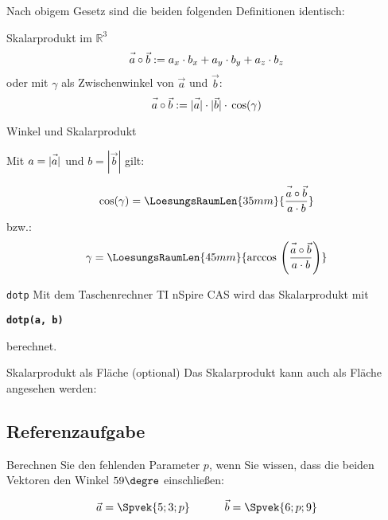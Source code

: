 Nach obigem Gesetz sind die beiden folgenden Definitionen identisch:
\begin{definition}{Skalarprodukt im $\mathbb{R}^3$}{}
  $$\vec{a\vphantom{b}}\circ\vec{b} := a_x\cdot{}b_x + a_y \cdot{} b_y + a_z\cdot{}b_z$$
oder mit $\gamma$ als Zwischenwinkel von $\vec{a}$ und $\vec{b}$:
  $$\vec{a\vphantom{b}}\circ\vec{b} := |\vec{\vphantom{b}a}| \cdot{} |\vec{b}| \cdot{}\cos({\gamma})$$
\end{definition}


\begin{gesetz}{Winkel und
    Skalarprodukt}{}


  Mit $a=|\vec{\vphantom{b}a}|$ und $b = |\vec{b}|$ gilt:
  
  $$\cos(\gamma) = \LoesungsRaumLen{35mm}{\frac{\vec{a\vphantom{b}}\circ\vec{b}}{a\cdot b}}$$
  bzw.:
  $$\gamma = \LoesungsRaumLen{45mm}{\arccos{} \left(\frac{\vec{a\vphantom{b}}\circ\vec{b}}{a\cdot b}\right)}$$
  
\end{gesetz}

\begin{bemerkung}{\texttt{dotp}}{}
Mit dem Taschenrechner TI nSpire CAS wird das Skalarprodukt mit

\begin{center}\textbf\texttt{dotp(a, b)}\end{center}

berechnet.

\end{bemerkung}


\begin{bemerkung}{Skalarprodukt als Fläche (optional)}{}
  Das Skalarprodukt kann auch als Fläche angesehen werden:
  
\end{bemerkung}
\newpage
\subsection{Referenzaufgabe}
Berechnen Sie den fehlenden Parameter $p$, wenn Sie wissen, dass die
beiden Vektoren den Winkel $59\degre$ einschließen:

$$\vec{a} = \Spvek{5;3;p} \hspace{11mm} \vec{b} = \Spvek{6;p;9}$$

